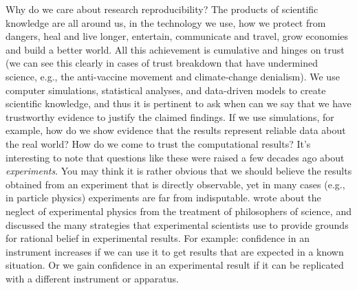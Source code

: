 \documentclass{statement}
\begin{document}
Why do we care about research reproducibility? 
The products of scientific knowledge are all around us, in the technology we use, how we protect from dangers, heal and live longer, entertain, communicate and travel, grow economies and build a better world. 
All this achievement is cumulative and hinges on trust (we can see this clearly in cases of trust breakdown that have undermined science, e.g., the anti-vaccine movement and climate-change denialism). 
We use computer simulations, statistical analyses, and data-driven models to create scientific knowledge, and thus it is pertinent to ask when can we say that we have trustworthy evidence to justify the claimed findings. 
If we use simulations, for example, how do we show evidence that the results represent reliable data about the real world? 
How do we come to trust the computational results? 
It's interesting to note that questions like these were raised a few decades ago about \emph{experiments}. 
You may think it is rather obvious that we should believe the results obtained from an experiment that is directly observable, yet in many cases (e.g., in particle physics) experiments are far from indisputable. 
\cite{franklin1989} wrote about the neglect of experimental physics from the treatment of philosophers of science, and discussed the many strategies that experimental scientists use to provide grounds for rational belief in experimental results. 
For example: confidence in an instrument increases if we can use it to get results that are expected in a known situation. 
Or we gain confidence in an experimental result if it can be replicated with a different instrument or apparatus. 
\end{document}
